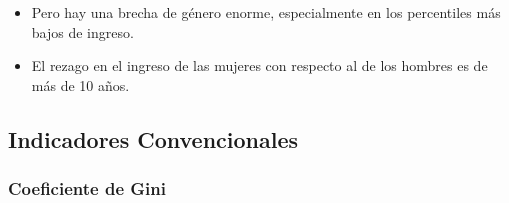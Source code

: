     \begin{tcolorbox}[enhanced, colback=mycolor,colframe=mycolor,drop fuzzy shadow,watermark color=white,
                        title=Principales Resultados]
    
                    \begin{itemize}
                    \item Pero hay una brecha de género enorme, especialmente en los percentiles más bajos de ingreso.
                    \item El rezago en el ingreso de las mujeres con respecto al de los hombres es de más de 10 años.
                \end{itemize}
     
    \end{tcolorbox}
    
    
    \subsection{Indicadores Convencionales}
        \subsubsection{Coeficiente de Gini}

